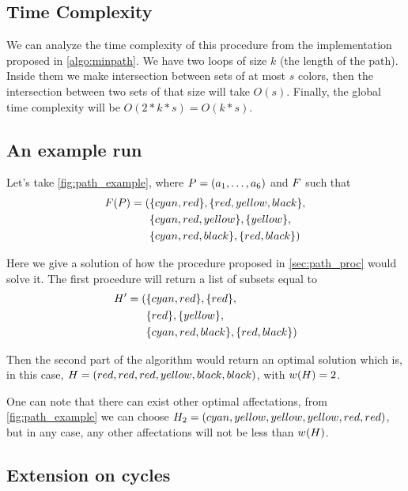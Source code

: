 \subsection{Time Complexity}

We can analyze the time complexity of this procedure from the implementation proposed in \cref{algo:minpath}. We have two loops of size $k$ (the length of the path). Inside them we make intersection between sets of at most $s$ colors, then the intersection between two sets of that size will take $O(s)$. Finally, the global time complexity will be $O(2 * k * s) = O(k*s)$.

\subsection{An example run}
\label{sec:path_ex_run}



Let's take \cref{fig:path_example}, where $P = (a_1,\ldots,a_{6})$ and $F$ such that
\begin{align*}
  F(P) = ( & \{cyan,red\}, \{red,yellow,black\},    \\
                   & \{cyan,red,yellow\}, \{yellow\},    \\
                   & \{cyan,red,black\}, \{red,black\}   )
\end{align*}

Here we give a solution of how the procedure proposed in \cref{sec:path_proc} would solve it. The first procedure will return a list of subsets equal to
\begin{align*}
  H' = ( & \{cyan,red\}, \{red\},      \\
               & \{red\}, \{yellow\},        \\
               & \{cyan,red,black\}, \{red,black\}   )
\end{align*}

Then the second part of the algorithm would return an optimal solution which is, in this case, $H = (red, red, red, yellow, black, black)$, with $w(H) = 2$.

One can note that there can exist other optimal affectations, from \cref{fig:path_example} we can choose $H_2 = (cyan, yellow, yellow, yellow, red, red)$, but in any case, any other affectations will not be less than  $w(H)$.

\subsection{Extension on cycles}

